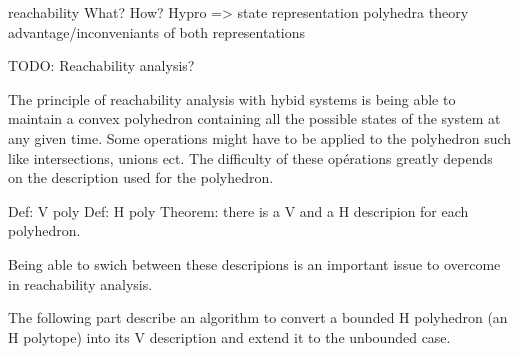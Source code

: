 reachability
What?
How?
Hypro
=> state representation
polyhedra theory
advantage/inconveniants of both representations








TODO: Reachability analysis?


The principle of reachability analysis with hybid systems is being able to maintain a convex polyhedron containing all the possible states of the system at any given time. Some operations might have to be applied to the polyhedron such like intersections, unions ect. The difficulty of these opérations greatly depends on the description used for the polyhedron.

Def: V poly
Def: H poly
Theorem: there is a V and a H descripion for each polyhedron.

Being able to swich between these descripions is an important issue to overcome in reachability analysis.

The following part describe an algorithm to convert a bounded H polyhedron (an H polytope) into its V description and extend it to the unbounded case.